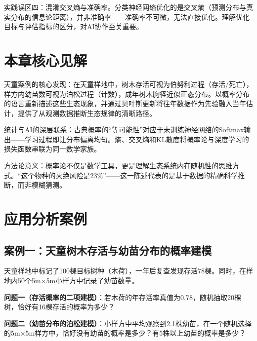 \documentclass[
  twoside,12pt,fontset=none]{ctexbook}
\begin{document}
实践误区四：混淆交叉熵与准确率。分类神经网络优化的是交叉熵（预测分布与真实分布的信息论距离），并非准确率------准确率不可微，无法直接优化。理解优化目标与评估指标的区分，对AI协作至关重要。

\hypertarget{ux672cux7ae0ux6838ux5fc3ux89c1ux89e3-1}{%
\section{本章核心见解}\label{ux672cux7ae0ux6838ux5fc3ux89c1ux89e3-1}}

天童案例的核心发现：在天童样地中，树木存活可视为伯努利过程（存活/死亡），样方内幼苗数可视为泊松过程（计数），成年树木胸径近似正态分布。以概率分布的语言重新描述这些生态现象，并通过贝叶斯更新将往年数据作为先验融入当年估计，提供了从观测数据推断生态规律的清晰路径。

统计与AI的深层联系：古典概率的``等可能性''对应于未训练神经网络的Softmax输出------学习过程即让分布偏离均匀。熵、交叉熵和KL散度将概率论与深度学习的损失函数串联为同一数学家族。

方法论意义：概率论不仅是数学工具，更是理解生态系统内在随机性的思维方式。``这个物种的灭绝风险是23\%''------这一陈述代表的是基于数据的精确科学推断，而非模糊猜测。

\hypertarget{ux5e94ux7528ux5206ux6790ux6848ux4f8b-1}{%
\section{应用分析案例}\label{ux5e94ux7528ux5206ux6790ux6848ux4f8b-1}}

\hypertarget{ux6848ux4f8bux4e00ux5929ux7ae5ux6811ux6728ux5b58ux6d3bux4e0eux5e7cux82d7ux5206ux5e03ux7684ux6982ux7387ux5efaux6a21}{%
\subsection{案例一：天童树木存活与幼苗分布的概率建模}\label{ux6848ux4f8bux4e00ux5929ux7ae5ux6811ux6728ux5b58ux6d3bux4e0eux5e7cux82d7ux5206ux5e03ux7684ux6982ux7387ux5efaux6a21}}

天童样地中标记了100棵目标树种（木荷），一年后复查发现存活78棵。同时，在样地内50个5m×5m小样方中记录了幼苗数量。

\textbf{问题一（存活概率的二项建模）}：若木荷的年存活率真值为0.78，随机抽取20棵树，恰好有16棵存活的概率为多少？

\textbf{问题二（幼苗分布的泊松建模）}：小样方中平均观察到2.1株幼苗，在一个随机选择的5m×5m样方中，恰好没有幼苗的概率是多少？有5株以上幼苗的概率是多少？
\end{document}

